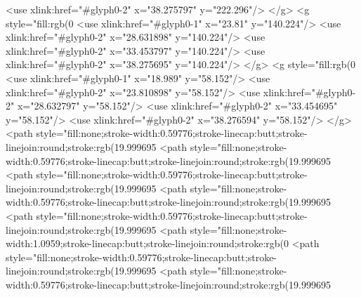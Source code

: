   <use xlink:href="#glyph0-2" x="38.275797" y="222.296"/>
</g>
<g style="fill:rgb(0%
  <use xlink:href="#glyph0-1" x="23.81" y="140.224"/>
  <use xlink:href="#glyph0-2" x="28.631898" y="140.224"/>
  <use xlink:href="#glyph0-2" x="33.453797" y="140.224"/>
  <use xlink:href="#glyph0-2" x="38.275695" y="140.224"/>
</g>
<g style="fill:rgb(0%
  <use xlink:href="#glyph0-1" x="18.989" y="58.152"/>
  <use xlink:href="#glyph0-2" x="23.810898" y="58.152"/>
  <use xlink:href="#glyph0-2" x="28.632797" y="58.152"/>
  <use xlink:href="#glyph0-2" x="33.454695" y="58.152"/>
  <use xlink:href="#glyph0-2" x="38.276594" y="58.152"/>
</g>
<path style="fill:none;stroke-width:0.59776;stroke-linecap:butt;stroke-linejoin:round;stroke:rgb(19.999695%
<path style="fill:none;stroke-width:0.59776;stroke-linecap:butt;stroke-linejoin:round;stroke:rgb(19.999695%
<path style="fill:none;stroke-width:0.59776;stroke-linecap:butt;stroke-linejoin:round;stroke:rgb(19.999695%
<path style="fill:none;stroke-width:0.59776;stroke-linecap:butt;stroke-linejoin:round;stroke:rgb(19.999695%
<path style="fill:none;stroke-width:0.59776;stroke-linecap:butt;stroke-linejoin:round;stroke:rgb(19.999695%
<path style="fill:none;stroke-width:1.0959;stroke-linecap:butt;stroke-linejoin:round;stroke:rgb(0%
<path style="fill:none;stroke-width:0.59776;stroke-linecap:butt;stroke-linejoin:round;stroke:rgb(19.999695%
<path style="fill:none;stroke-width:0.59776;stroke-linecap:butt;stroke-linejoin:round;stroke:rgb(19.999695%

